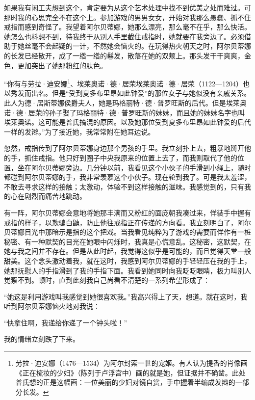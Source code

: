 \par 如果我有闲工夫想到这个，肯定要为从这个艺术处理中找不到优美之处而难过。可那时我的心思完全不在这个上。参加游戏的男男女女，开始对我那么愚蠢、抓不住戒指而感到奇怪了。我望着阿尔贝蒂娜，她那么漂亮，那么毫不在乎，那么快活。她怎么也料想不到，待我终于从别人手里截住戒指时，她就要在我旁边了。必须借助于她丝毫不会起疑的一计，不然她会恼火的。在玩得热火朝天之时，阿尔贝蒂娜的长发已经散开，成了一绺一绺的鬈发，散落在她的双颊上。那头发干干爽爽，金色，更加突出了她那粉红的肤色。
\par “你有与劳拉·迪安娜\footnote{劳拉·迪安娜（1476—1534）为阿尔封索一世的宠姬。有人认为提香的肖像画《正在梳妆的少妇》（陈列于卢浮宫中）画的就是她，但证据并不确凿。此处普氏想的正是这幅画：一位美丽的少妇对镜自赏，手中握着半编成发辫的一部分长发。}、埃莱奥诺·德·居荣埃莱奥诺·德·居荣（1122—1204）也以秀发而出名。但是“受到夏多布里昂如此钟爱”的那位女子与她似没有亲戚关系。此人为德·居斯蒂娜侯爵夫人，她是玛格丽特·德·普罗旺斯的后代。但是埃莱奥诺·德·居荣的孙子娶了玛格丽特·德·普罗旺斯的妹妹，而且她的妹妹名字也叫埃莱奥诺。这可能是普氏搞混的原因。以及她那位受到夏多布里昂如此钟爱的后代一样的发辫。”为了接近她，我常常附在她耳边说。
\par 忽然，戒指传到了阿尔贝蒂娜身边那个男孩的手里。我立刻扑上去，粗暴地掰开他的手，抓住戒指。他只好到圈子中央我原来的位置上去了，而我则取代了他的位置，坐在阿尔贝蒂娜旁边。几分钟以前，我看见这个小伙子的手滑到小绳上，随时都碰到阿尔贝蒂娜的手，我非常羡慕这个小伙子。现在轮到我了。可是我太羞涩，不敢去寻求这样的接触；太激动，体验不到这样接触的滋味。我感觉到的，只有我的心在剧烈而痛苦地跳动。
\par 有一阵，阿尔贝蒂娜会意地将她那丰满而又粉红的面庞朝我凑过来，佯装手中握有戒指的样子，以欺骗白鼬，防止他往戒指正在传递的方向看。我立刻明白了，阿尔贝蒂娜目光中那暗示是指的这个把戏。当我看见纯粹为了游戏的需要而佯作有一桩秘密、有一种默契的目光在她眼中闪烁时，我真是心慌意乱。这秘密，这默契，在她与我之间并不存在。但是从此时起，我觉得这似乎是可能的，而且觉得天堂一般甜美。这个念头激动着我，就在这时，我感到阿尔贝蒂娜的手轻轻压在我的手上，她那抚慰人的手指滑到了我的手指下面。我看到她同时向我眨眨眼睛，极力叫别人觉察不到。顿时，直到此刻我自己尚看不清楚的一系列希望形成了：
\par “她这是利用游戏叫我感觉到她很喜欢我。”我高兴得上了天，想道。就在这时，我听到阿尔贝蒂娜恼火地对我说：
\par “快拿住啊，我递给你递了一个钟头啦！”
\par 我的情绪立刻跌了下来。
